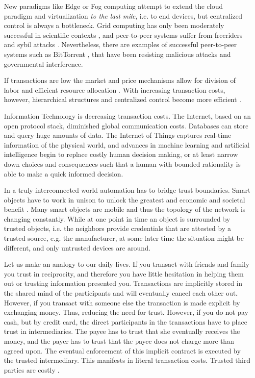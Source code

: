 New paradigms like Edge or Fog computing \parencite{Bonomi:2012:FCR:2342509.2342513,Yi:2015:SFC:2757384.2757397} attempt to extend the cloud paradigm and virtualization \emph{to the last mile}, i.e. to end devices, but centralized control is always a bottleneck. Grid computing has only been moderately successful in scientific contexts \parencite{Anderson:2002:SEP:581571.581573,Beberg2009Folding}, and peer-to-peer systems \parencite{Rodrigues:2010:PS:1831407.1831427} suffer from freeriders \parencite{10.2307/3003400} and sybil attacks \parencite{douceur2002sybil}. Nevertheless, there are examples of successful peer-to-peer systems such as BitTorrent \parencite{cohen2003incentives}, that have been resisting malicious attacks and governmental interference.

If transactions are low the market and price mechanisms allow for division of labor and efficient resource allocation \parencite{smith1887inquiry}. With increasing transaction costs, however, hierarchical structures and centralized control become more efficient \parencite{ECCA:ECCA386}. 

Information Technology is decreasing transaction costs. The Internet, based on an open protocol stack, diminished global communication costs. Databases can store and query huge amounts of data. The Internet of Things captures real-time information of the physical world, and advances in machine learning and artificial intelligence begin to replace costly human decision making, or at least narrow down choices and consequences such that a human with bounded rationality \parencite{simon1982models} is able to make a quick informed decision. 

In a truly interconnected world automation has to bridge trust boundaries. Smart objects have to work in unison to unlock the greatest and economic and societal benefit \parencite{manyika2015unlocking}.
Many smart objects are mobile and thus the topology of the network is changing constantly. While at one point in time an object is surrounded by trusted objects, i.e. the neighbors provide credentials that are attested by a trusted source, e.g. the manufacturer, at some later time the situation might be different, and only untrusted devices are around. 

Let us make an analogy to our daily lives. If you transact with friends and family you trust in reciprocity, and therefore you have little hesitation in helping them out or trusting information presented you. Transactions are implicitly stored in the shared mind of the participants and will eventually cancel each other out. However, if you transact with someone else the transaction is made explicit by exchanging money. Thus, reducing the need for trust. However, if you do not pay cash, but by credit card, the direct participants in the transactions have to place trust in intermediaries. The payee has to trust that she eventually receives the money, and the payer has to trust that the payee does not charge more than agreed upon. The eventual enforcement of this implicit contract is executed by the trusted intermediary. This manifests in literal transaction costs. Trusted third parties are costly \parencite{szabo2005trusted}.

